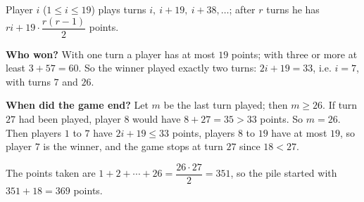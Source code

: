 Player $i$ ($1\le i\le19$) plays turns $i,\ i+19,\ i+38,\dots$; after $r$ turns he has $ri+19\cdot\dfrac{r(r-1)}{2}$ points.

\textbf{Who won?} With one turn a player has at most $19$ points; with three or more at least $3+57=60$. So the winner played exactly two turns: $2i+19=33$, i.e. $i=7$, with turns $7$ and $26$.

\textbf{When did the game end?} Let $m$ be the last turn played; then $m\ge26$. If turn $27$ had been played, player $8$ would have $8+27=35>33$ points. So $m=26$. Then players $1$ to $7$ have $2i+19\le33$ points, players $8$ to $19$ have at most $19$, so player $7$ is the winner, and the game stops at turn $27$ since $18<27$.

The points taken are $1+2+\cdots+26=\dfrac{26\cdot27}{2}=351$, so the pile started with $351+18=\boxed{369}$ points.
